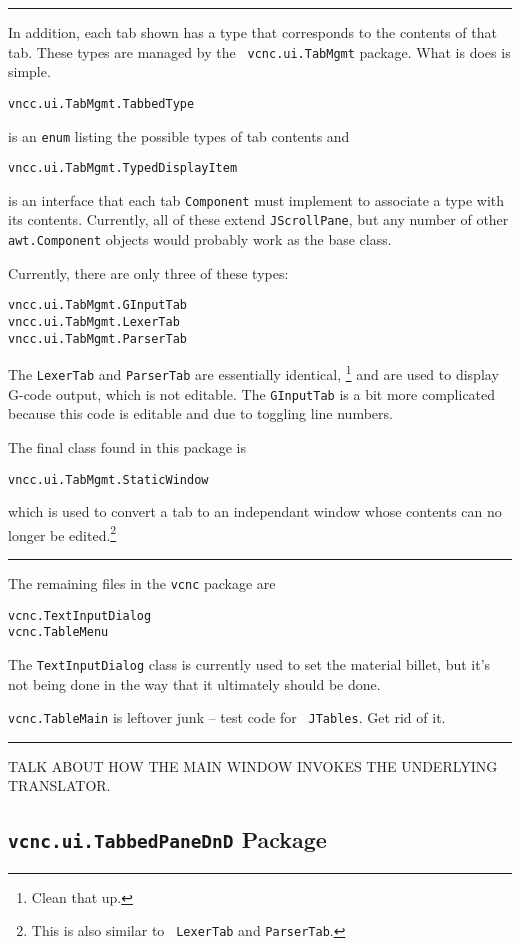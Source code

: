 \documentclass[titlepage,oneside,10pt]{article}
\newcommand\rulediv{\vskip 0mm\hfil\rule{0.4\textwidth}{0.4pt}\hfil\vskip 1mm}
\begin{document}
\rulediv

In addition, each tab shown has a type that corresponds to the
contents of that tab. These types are managed by the {\tt
  vcnc.ui.TabMgmt} package. What is does is simple.

\begin{verbatim}
vncc.ui.TabMgmt.TabbedType
\end{verbatim}
is an {\tt enum} listing the possible types of tab contents and
\begin{verbatim}
vncc.ui.TabMgmt.TypedDisplayItem
\end{verbatim}
is an interface that each tab {\tt Component} must implement to
associate a type with its contents. Currently, all of these extend
{\tt JScrollPane}, but any number of other {\tt awt.Component}
objects would probably work as the base class.

Currently, there are only three of these types:
\begin{verbatim}
vncc.ui.TabMgmt.GInputTab
vncc.ui.TabMgmt.LexerTab
vncc.ui.TabMgmt.ParserTab
\end{verbatim}
The {\tt LexerTab} and {\tt ParserTab} are essentially identical,
\footnote{Clean that up.} and are used to display G-code output, which
is not editable. The {\tt GInputTab} is a bit more complicated because
this code is editable and due to toggling line numbers.

The final class found in this package is 
\begin{verbatim}
vncc.ui.TabMgmt.StaticWindow
\end{verbatim}
which is used to convert a tab to an independant window whose contents
can no longer be edited.\footnote{This is also similar to {\tt
  LexerTab} and {\tt ParserTab}.}

\rulediv

The remaining files in the {\tt vcnc} package are 

\begin{verbatim}
vcnc.TextInputDialog
vcnc.TableMenu
\end{verbatim}
The {\tt TextInputDialog} class is currently used to set the material
billet, but it's not being done in the way that it ultimately should
be done.

{\tt vcnc.TableMain} is leftover junk -- test code for {\tt
  JTables}. Get rid of it.

\rulediv

TALK ABOUT HOW THE MAIN WINDOW INVOKES THE UNDERLYING TRANSLATOR.

\subsection{{\tt vcnc.ui.TabbedPaneDnD} Package}
\end{document}
